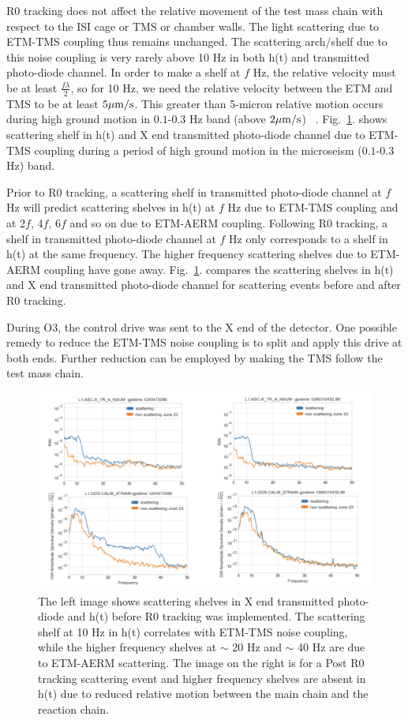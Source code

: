 \documentclass[12pt]{iopart}
\begin{document}
\par
R0 tracking does not affect the relative movement of the test mass chain with respect to the ISI cage or TMS or chamber walls. The light scattering due to ETM-TMS coupling thus remains unchanged. The scattering arch/shelf due to this noise coupling is very rarely above 10 Hz in both h(t) and transmitted photo-diode channel. In order to make a shelf at $f$ Hz, the relative velocity must be at least $\frac{f{\lambda}}{2}$, so for 10 Hz, we need the relative velocity between the ETM and TMS to be at least $5\mu{\rm m/s}$. This greater than 5-micron relative motion occurs during high ground motion in $0.1$-$0.3$ Hz band (above $2\mu{\rm m/s}$) ~\cite{alogsid_trans}. Fig.~\ref{fig:etm-transmon}. shows scattering shelf in h(t) and X end transmitted photo-diode channel due to ETM-TMS coupling during a period of high ground motion in the microseism ($0.1$-$0.3$ Hz) band.
\par
Prior to R0 tracking, a scattering shelf in transmitted photo-diode channel at $f$ Hz will predict scattering shelves in h(t) at $f$ Hz due to ETM-TMS coupling and at 2$f$, 4$f$, 6$f$ and so on due to ETM-AERM coupling. Following R0 tracking, a shelf in transmitted photo-diode channel at $f$ Hz only corresponds to a shelf in h(t) at the same frequency. The higher frequency scattering shelves due to ETM-AERM coupling have gone away. Fig.~\ref{fig:etm-transmon}.
compares the scattering shelves in h(t) and X end transmitted photo-diode channel for scattering events before and after R0 tracking.
\par
During O3, the control drive was sent to the X end of the detector. One possible remedy to reduce the ETM-TMS noise coupling is to split and apply this drive at both ends. Further reduction can be employed by making the TMS follow the test mass chain. 
\begin{figure}[h]
    \centering
    \includegraphics[width=\textwidth]{etm-transmon1.png}
    \caption{The left image shows scattering shelves in X end transmitted photo-diode and h(t) before R0 tracking was implemented. The scattering shelf at 10 Hz in h(t) correlates with ETM-TMS noise coupling, while the higher frequency shelves at $\sim$ 20 Hz and $\sim$ 40 Hz are due to ETM-AERM scattering. The image on the right is for a Post R0 tracking scattering event and higher frequency shelves are absent in h(t) due to reduced relative motion between the main chain and the reaction chain.}
    \label{fig:etm-transmon}
\end{figure}
\end{document}
